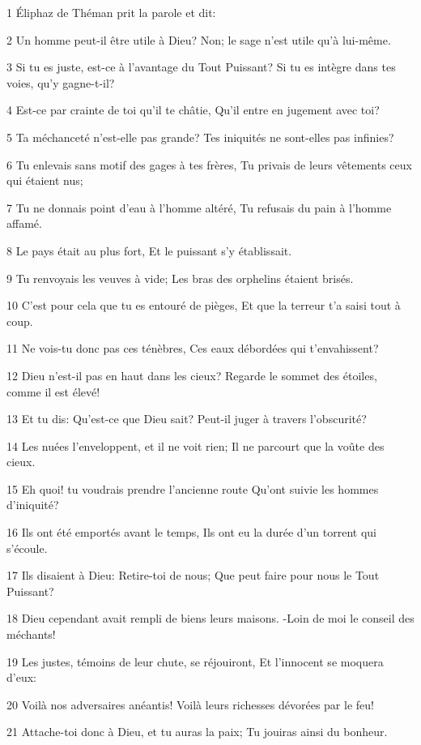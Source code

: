 \par 1 Éliphaz de Théman prit la parole et dit:
\par 2 Un homme peut-il être utile à Dieu? Non; le sage n'est utile qu'à lui-même.
\par 3 Si tu es juste, est-ce à l'avantage du Tout Puissant? Si tu es intègre dans tes voies, qu'y gagne-t-il?
\par 4 Est-ce par crainte de toi qu'il te châtie, Qu'il entre en jugement avec toi?
\par 5 Ta méchanceté n'est-elle pas grande? Tes iniquités ne sont-elles pas infinies?
\par 6 Tu enlevais sans motif des gages à tes frères, Tu privais de leurs vêtements ceux qui étaient nus;
\par 7 Tu ne donnais point d'eau à l'homme altéré, Tu refusais du pain à l'homme affamé.
\par 8 Le pays était au plus fort, Et le puissant s'y établissait.
\par 9 Tu renvoyais les veuves à vide; Les bras des orphelins étaient brisés.
\par 10 C'est pour cela que tu es entouré de pièges, Et que la terreur t'a saisi tout à coup.
\par 11 Ne vois-tu donc pas ces ténèbres, Ces eaux débordées qui t'envahissent?
\par 12 Dieu n'est-il pas en haut dans les cieux? Regarde le sommet des étoiles, comme il est élevé!
\par 13 Et tu dis: Qu'est-ce que Dieu sait? Peut-il juger à travers l'obscurité?
\par 14 Les nuées l'enveloppent, et il ne voit rien; Il ne parcourt que la voûte des cieux.
\par 15 Eh quoi! tu voudrais prendre l'ancienne route Qu'ont suivie les hommes d'iniquité?
\par 16 Ils ont été emportés avant le temps, Ils ont eu la durée d'un torrent qui s'écoule.
\par 17 Ils disaient à Dieu: Retire-toi de nous; Que peut faire pour nous le Tout Puissant?
\par 18 Dieu cependant avait rempli de biens leurs maisons. -Loin de moi le conseil des méchants!
\par 19 Les justes, témoins de leur chute, se réjouiront, Et l'innocent se moquera d'eux:
\par 20 Voilà nos adversaires anéantis! Voilà leurs richesses dévorées par le feu!
\par 21 Attache-toi donc à Dieu, et tu auras la paix; Tu jouiras ainsi du bonheur.
